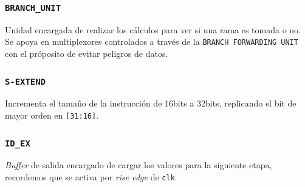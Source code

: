 \documentclass[a4paper]{article}
\begin{document}
\subsubsection{\texttt{BRANCH\_UNIT}}
Unidad encargada de realizar los cálculos para ver si una rama es tomada o no. Se apoya en multiplexores controlados a través de la \texttt{BRANCH FORWARDING UNIT} con el próposito de evitar peligros de datos. 

\subsubsection{\texttt{S-EXTEND}}
Incrementa el tamaño de la instrucción de 16bits a 32bits, replicando el bit de mayor orden en \texttt{[31:16]}.

\subsubsection{\texttt{ID\_EX}}
\textit{Buffer} de salida encargado de cargar los valores para la siguiente etapa, recordemos que se activa por \textit{rise edge} de \texttt{clk}.

%
\end{document}
